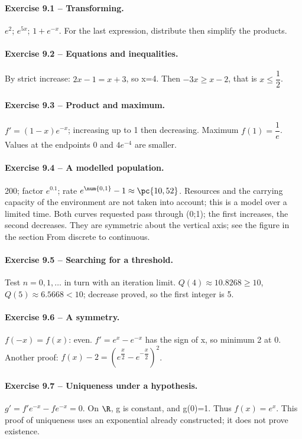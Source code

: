 \paragraph{Exercise 9.1 -- Transforming.} $e^2$; $e^{5x}$; $1+e^{-x}$. For the last expression, distribute then simplify the products.
\paragraph{Exercise 9.2 -- Equations and inequalities.} By strict increase: $2x-1=x+3$, so x=4. Then $-3x\geq x-2$, that is $x\leq \dfrac{1}{2}$.
\paragraph{Exercise 9.3 -- Product and maximum.} $f\prime=(1-x)e^{-x}$; increasing up to 1 then decreasing. Maximum $f(1)=\dfrac{1}{e}$. Values at the endpoints 0 and $4e^{-4}$ are smaller.
\paragraph{Exercise 9.4 -- A modelled population.} 200; factor $e^{\num{0,1}}$; rate $e^{\num{0,1}}-1\approx\pc{10,52}$. Resources and the carrying capacity of the environment are not taken into account; this is a model over a limited time. Both curves requested pass through (0;1); the first increases, the second decreases. They are symmetric about the vertical axis; see the figure in the section From discrete to continuous.
\paragraph{Exercise 9.5 -- Searching for a threshold.} Test $n=0,1,\ldots$ in turn with an iteration limit. $Q(4)\approx\num{10,8268}\geq10$, $Q(5)\approx\num{6,5668}<10$; decrease proved, so the first integer is 5.
\paragraph{Exercise 9.6 -- A symmetry.} $f(-x)=f(x)$: even. $f\prime=e^x-e^{-x}$ has the sign of x, so minimum 2 at 0. Another proof: $f(x)-2=(e^{\dfrac{x}{2}}-e^{-\dfrac{x}{2}})^2$.
\paragraph{Exercise 9.7 -- Uniqueness under a hypothesis.} $g\prime=f\prime e^{-x}-fe^{-x}=0$. On $\R$, g is constant, and g(0)=1. Thus $f(x)=e^x$. This proof of uniqueness uses an exponential already constructed; it does not prove existence.
